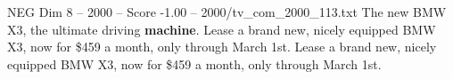 \begin{textsample}{NEG Dim 8 – 2000 – Score -1.00 – 2000/tv\_com\_2000\_113.txt}  \label{ex:f8_neg_066}
The new BMW X3, the ultimate driving \textbf{machine}.
Lease a brand new, nicely equipped BMW X3, now for \$459 a month, only through March 1st.
Lease a brand new, nicely equipped BMW X3, now for \$459 a month, only through March 1st.

\end{textsample}
